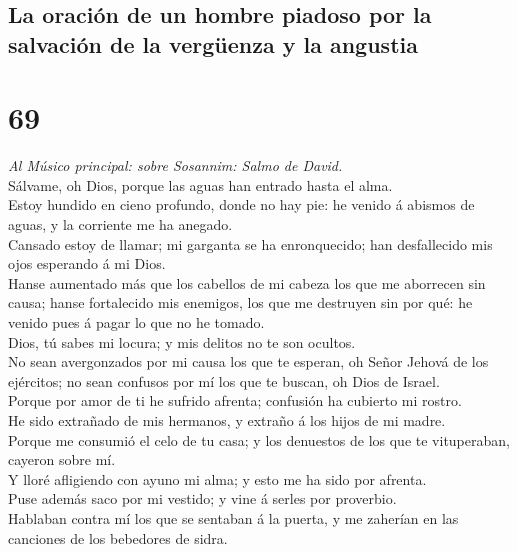\hypertarget{la-oraciuxf3n-de-un-hombre-piadoso-por-la-salvaciuxf3n-de-la-verguxfcenza-y-la-angustia}{%
\subsection{La oración de un hombre piadoso por la salvación de la
vergüenza y la
angustia}\label{la-oraciuxf3n-de-un-hombre-piadoso-por-la-salvaciuxf3n-de-la-verguxfcenza-y-la-angustia}}

\hypertarget{section-68}{%
\section{69}\label{section-68}}

 \emph{Al Músico principal: sobre Sosannim: Salmo de
David.}\\
Sálvame, oh Dios, porque las aguas han entrado hasta el alma.\\
 Estoy hundido en cieno profundo, donde no hay pie: he
venido á abismos de aguas, y la corriente me ha anegado.\\
 Cansado estoy de llamar; mi garganta se ha enronquecido;
han desfallecido mis ojos esperando á mi Dios.\\
 Hanse aumentado más que los cabellos de mi cabeza los que
me aborrecen sin causa; hanse fortalecido mis enemigos, los que me
destruyen sin por qué: he venido pues á pagar lo que no he tomado.\\
 Dios, tú sabes mi locura; y mis delitos no te son
ocultos.\\
 No sean avergonzados por mi causa los que te esperan, oh
Señor Jehová de los ejércitos; no sean confusos por mí los que te
buscan, oh Dios de Israel.\\
 Porque por amor de ti he sufrido afrenta; confusión ha
cubierto mi rostro.\\
 He sido extrañado de mis hermanos, y extraño á los hijos de
mi madre.\\
 Porque me consumió el celo de tu casa; y los denuestos de
los que te vituperaban, cayeron sobre mí.\\
 Y lloré afligiendo con ayuno mi alma; y esto me ha sido
por afrenta.\\
 Puse además saco por mi vestido; y vine á serles por
proverbio.\\
 Hablaban contra mí los que se sentaban á la puerta, y me
zaherían en las canciones de los bebedores de sidra.\\
